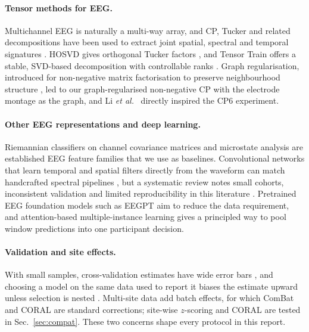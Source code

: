 \documentclass[10pt,twocolumn,a4paper]{article}
\begin{document}
\paragraph{Tensor methods for EEG.} Multichannel EEG is naturally a multi-way array, and CP, Tucker and related decompositions have been used to extract joint spatial, spectral and temporal signatures \cite{kolda2009,cong2015,cichocki2015}. HOSVD gives orthogonal Tucker factors \cite{delathauwer2000}, and Tensor Train offers a stable, SVD-based decomposition with controllable ranks \cite{oseledets2011}. Graph regularisation, introduced for non-negative matrix factorisation to preserve neighbourhood structure \cite{cai2011}, led to our graph-regularised non-negative CP with the electrode montage as the graph, and Li \emph{et al.}\ \cite{li2024} directly inspired the CP6 experiment.

\paragraph{Other EEG representations and deep learning.} Riemannian classifiers on channel covariance matrices \cite{barachant2012} and microstate analysis \cite{michel2018} are established EEG feature families that we use as baselines. Convolutional networks that learn temporal and spatial filters directly from the waveform can match handcrafted spectral pipelines \cite{schirrmeister2017,lawhern2018}, but a systematic review notes small cohorts, inconsistent validation and limited reproducibility in this literature \cite{roy2019}. Pretrained EEG foundation models such as EEGPT \cite{wang2024} aim to reduce the data requirement, and attention-based multiple-instance learning \cite{ilse2018} gives a principled way to pool window predictions into one participant decision.

\paragraph{Validation and site effects.} With small samples, cross-validation estimates have wide error bars \cite{varoquaux2018}, and choosing a model on the same data used to report it biases the estimate upward unless selection is nested \cite{cawley2010}. Multi-site data add batch effects, for which ComBat \cite{johnson2007} and CORAL \cite{sun2016} are standard corrections; site-wise $z$-scoring and CORAL are tested in Sec.~\ref{sec:compat}. These two concerns shape every protocol in this report.

\end{document}
